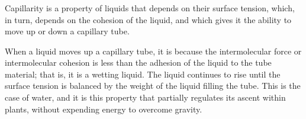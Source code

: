\begin{frame}
	\frametitle{\secname}
	\begin{center}\Huge %
	\end{center}
\end{frame}
\begin{frame}
	\frametitle{\secname}
	Capillarity is a property of liquids that depends on their surface tension, which, in turn, depends on the cohesion of the liquid, and which gives it the ability to move up or down a capillary tube.

When a liquid moves up a capillary tube, it is because the intermolecular force or intermolecular cohesion is less than the adhesion of the liquid to the tube material; that is, it is a wetting liquid. The liquid continues to rise until the surface tension is balanced by the weight of the liquid filling the tube. This is the case of water, and it is this property that partially regulates its ascent within plants, without expending energy to overcome gravity.
\end{frame}

